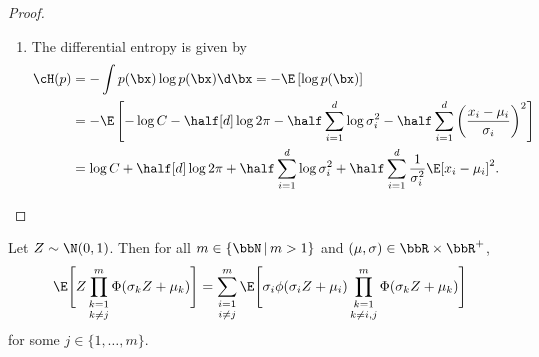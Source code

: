 \documentclass[]{article}
\begin{document}
\begin{proof}
\begin{enumerate}[label=(\roman*)]
  \item The differential entropy is given by
  \begin{align*}
    \cH(p) &= -\int p(\bx) \log p(\bx) \d \bx = -\E \left[ \log p(\bx) \right] \\
    &= -\E \left[-\log C - \half[d] \log 2\pi - \half \sum_{i=1}^d \log \sigma_i^2 - \half \sum_{i=1}^d \left( \frac{x_i - \mu_i}{\sigma_i} \right)^2 \right] \\
    &= \log C + \half[d] \log 2\pi + \half \sum_{i=1}^d \log \sigma_i^2 + \half \sum_{i=1}^d \frac{1}{\sigma_i^2} \E [ x_i - \mu_i ]^2.
  \end{align*}
\end{enumerate}  
\end{proof}

\begin{lemma}\label{lem:EZgZ}
  Let $Z \sim \N(0,1)$. Then for all $m \in \{\bbN \, | \, m > 1\}$ and $(\mu, \sigma) \in \bbR \times \bbR^+$, 
  \[
    \E \Bigg[ Z \mathop{\prod_{k=1}^m}_{k \neq j} \Phi(\sigma_k Z + \mu_k) \Bigg]
    = \mathop{\sum_{i=1}^m}_{i \neq j} \E \Bigg[ \sigma_i \phi(\sigma_i Z + \mu_i) \mathop{\prod_{k=1}^m}_{k \neq i,j} \Phi (\sigma_k Z + \mu_k) \Bigg]
  \]
  for some $j \in \{1, \dots, m\}$.
\end{lemma}
\end{document}
